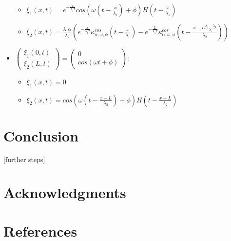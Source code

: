 \documentclass[preprint]{elsarticle}
\begin{document}
\begin{itemize}
\begin{itemize}
\item $\xi_{1}\left(x,t\right)=e^{-\frac{x}{\lambda_{1}\tau}}cos\left(\omega\left(t-\frac{x}{\lambda_{1}}\right)+\phi\right)H\left(t-\frac{x}{\lambda_{1}}\right)$
\item $\xi_{2}\left(x,t\right)=\frac{\lambda_{1}\alpha}{\lambda_{2}}\left(e^{-\frac{x}{\lambda_{1}\tau}}\kappa_{\alpha,\omega,\phi}^{cos}\left(t-\frac{x}{\lambda_{1}}\right)-e^{-\frac{L}{\lambda_{1}\tau}}\kappa_{\alpha,\omega,\phi}^{cos}\left(t-\frac{x-L\frac{\lambda_{1}-\lambda_{2}}{\lambda_{1}}}{\lambda_{2}}\right)\right)$
\end{itemize}
\item $\left(\begin{array}{c}
\xi_{1}\left(0,t\right)\\
\xi_{2}\left(L,t\right)
\end{array}\right)=\left(\begin{array}{c}
0\\
cos\left(\omega t+\phi\right)
\end{array}\right)$:

\begin{itemize}
\item $\xi_{1}\left(x,t\right)=0$
\item $\xi_{2}\left(x,t\right)=cos\left(\omega\left(t-\frac{x-L}{\lambda_{2}}\right)+\phi\right)H\left(t-\frac{x-L}{\lambda_{2}}\right)$\end{itemize}
\end{itemize}



\section{Conclusion}
[further steps]

\section*{Acknowledgments}


\section*{References}


\end{document}
